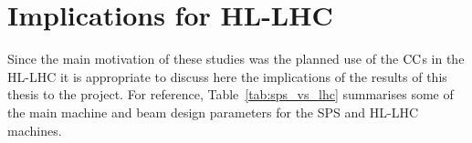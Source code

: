 






\section{Implications for HL-LHC}
Since the main motivation of these studies was the planned use of the ${\mathrm{CC}}$s in the HL-LHC it is appropriate to discuss here the implications of the results of this thesis to the project. For reference, Table~\ref{tab:sps_vs_lhc} summarises some of the main machine and beam design parameters for the SPS and HL-LHC machines.

